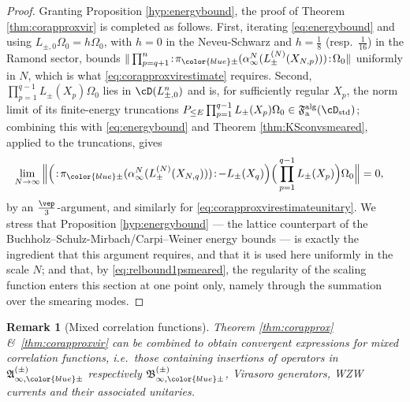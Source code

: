 \documentclass[a4paper, 11pt]{article}
\newcommand{\fA}{\mathfrak{A}}\newcommand{\cA}{\mathcal{A}}\newcommand{\dA}{\mathds{A}}\newcommand{\sA}{\mathscr{A}}
\newcommand{\ua}{\textup a}
\newcommand{\fB}{\mathfrak{B}}\newcommand{\cB}{\mathcal{B}}\newcommand{\dB}{\mathds{B}}\newcommand{\sB}{\mathscr{B}}
\newcommand{\fF}{\mathfrak{F}}\newcommand{\cF}{\mathcal{F}}\newcommand{\dF}{\mathds{F}}\newcommand{\sF}{\mathscr{F}}
\DeclareMathOperator{\1}{\mathds{1}}
\DeclareMathOperator{\std}{std}
\DeclareMathOperator{\alg}{alg}
\newtheorem{rem}[thm]{Remark}
\begin{document}
\begin{proof}
Granting Proposition \ref{hyp:energybound}, the proof of Theorem \ref{thm:corapproxvir} is completed as follows. First, iterating \eqref{eq:energybound} and using $L_{\pm,0}\Omega_{0}=h\Omega_{0}$, with $h=0$ in the Neveu-Schwarz and $h=\tfrac{1}{8}$ (resp.~$\tfrac{1}{16}$) in the Ramond sector, bounds $\|\prod_{p=q+1}^{n}\!:\!\pi_{{\color{blue}\pm}}(\alpha^{N}_{\infty}(L^{(N)}_{\pm}(X_{N,p})))\!:\!\Omega_{0}\|$ uniformly in $N$, which is what \eqref{eq:corapproxvirestimate} requires. Second, $\prod_{p=1}^{q-1}L_{\pm}(X_{p})\Omega_{0}$ lies in $\cD(L_{\pm,0}^{n})$ and is, for sufficiently regular $X_{p}$, the norm limit of its finite-energy truncations $P_{\leq E}\prod_{p=1}^{q-1}L_{\pm}(X_{p})\Omega_{0}\in\fF^{\alg}_{\ua}(\cD_{\std})$; combining this with \eqref{eq:energybound} and Theorem \ref{thm:KSconvsmeared}, applied to the truncations, gives
\begin{align*}
\lim_{N\rightarrow\infty}\Big\|\Big(\!:\!\pi_{{\color{blue}\pm}}(\alpha^{N}_{\infty}(L^{(N)}_{\pm}(X_{N,q})))\!:\!-L_{\pm}(X_{q})\Big)\Big(\prod_{p=1}^{q-1}L_{\pm}(X_{p})\Big)\Omega_{0}\Big\| & = 0,
\end{align*}
by an $\tfrac{\vep}{3}$-argument, and similarly for \eqref{eq:corapproxvirestimateunitary}. We stress that Proposition \ref{hyp:energybound} --- the lattice counterpart of the Buchholz--Schulz-Mirbach/Carpi--Weiner energy bounds --- is exactly the ingredient that this argument requires, and that it is used here uniformly in the scale $N$; and that, by \eqref{eq:relbound1psmeared}, the regularity of the scaling function enters this section at one point only, namely through the summation over the smearing modes.
\end{proof}
\begin{rem}[Mixed correlation functions]
\label{rem:corapproxvir}
Theorem \ref{thm:corapprox} \& \ref{thm:corapproxvir} can be combined to obtain convergent expressions for mixed correlation functions, i.e.~those containing insertions of operators in $\fA^{(\pm)}_{\infty,{\color{blue}\pm}}$ respectively $\fB^{(\pm)}_{\infty,{\color{blue}\pm}}$, Virasoro generators, WZW currents and their associated unitaries.
\end{rem}
\end{document}
